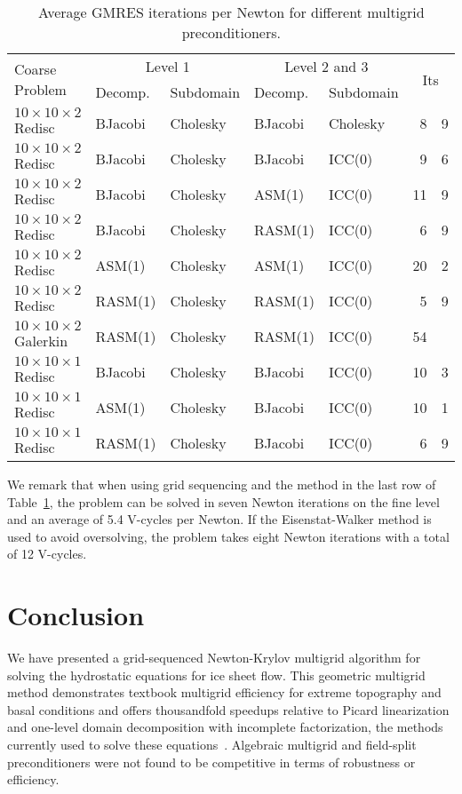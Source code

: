 \documentclass[3p]{elsarticle}
\begin{document}
\begin{table}
  \centering\caption{Average GMRES iterations per Newton for different multigrid preconditioners.}\label{tab:xmg}
  \begin{tabular}{l|ll|ll|r@{.}l}
    \multirow{2}{*}{Coarse Problem} & \multicolumn{2}{c|}{Level 1} & \multicolumn{2}{c|}{Level 2 and 3} & \multicolumn{2}{c}{\multirow{2}{*}{Its}} \\
                                   & Decomp. & Subdomain & Decomp. & Subdomain         \\ \hline
    $10\times 10\times 2$ Redisc   & BJacobi & Cholesky & BJacobi & Cholesky & 8  & 9 \\
    $10\times 10\times 2$ Redisc   & BJacobi & Cholesky & BJacobi & ICC(0)   & 9  & 6 \\
    $10\times 10\times 2$ Redisc   & BJacobi & Cholesky & ASM(1)  & ICC(0)   & 11 & 9 \\
    $10\times 10\times 2$ Redisc   & BJacobi & Cholesky & RASM(1) & ICC(0)   & 6  & 9 \\
    $10\times 10\times 2$ Redisc   & ASM(1)  & Cholesky & ASM(1)  & ICC(0)   & 20 & 2 \\
    $10\times 10\times 2$ Redisc   & RASM(1) & Cholesky & RASM(1) & ICC(0)   & 5  & 9 \\
    $10\times 10\times 2$ Galerkin & RASM(1) & Cholesky & RASM(1) & ICC(0)   & 54 &   \\
    $10\times 10\times 1$ Redisc   & BJacobi & Cholesky & BJacobi & ICC(0)   & 10 & 3 \\
    $10\times 10\times 1$ Redisc   & ASM(1)  & Cholesky & BJacobi & ICC(0)   & 10 & 1 \\
    $10\times 10\times 1$ Redisc   & RASM(1) & Cholesky & BJacobi & ICC(0)   & 6  & 9 \\
  \end{tabular}
\end{table}

We remark that when using grid sequencing and the method in the last row of Table~\ref{tab:xmg}, the problem can be solved in seven Newton iterations on the fine level and an average of 5.4 V-cycles per Newton.
If the Eisenstat-Walker method is used to avoid oversolving, the problem takes eight Newton iterations with a total of 12 V-cycles.

\section{Conclusion}
We have presented a grid-sequenced Newton-Krylov multigrid algorithm for solving the hydrostatic equations for ice sheet flow.
This geometric multigrid method demonstrates textbook multigrid efficiency for extreme topography and basal conditions and offers thousandfold speedups relative to Picard linearization and one-level domain decomposition with incomplete factorization, the methods currently used to solve these equations~\cite{seacism,issm,johnson2007modeling,desmedt2010using,pattyn2003ntd}.
Algebraic multigrid and field-split preconditioners were not found to be competitive in terms of robustness or efficiency.
\end{document}
